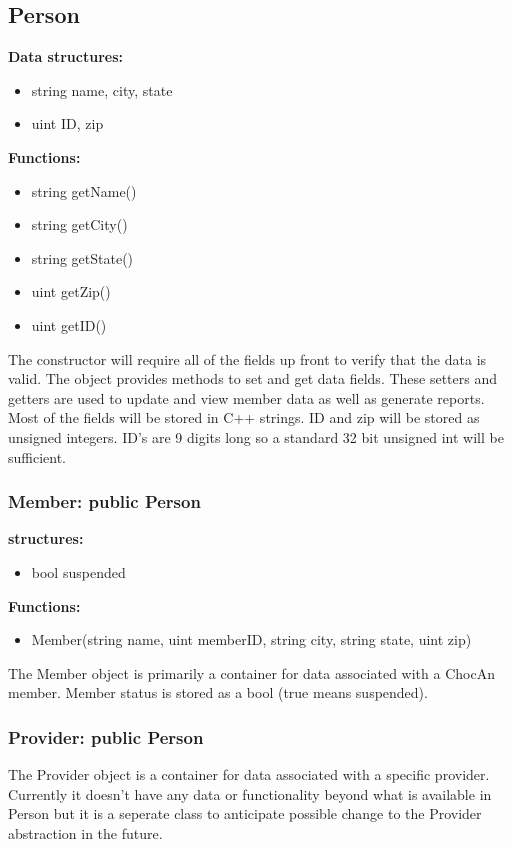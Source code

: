 \documentclass{article}
\begin{document}
\subsection{Person}
\textbf{Data structures:}
\begin{itemize}
   \item string name, city, state
   \item uint ID, zip
\end{itemize}
\textbf{Functions:}
\begin{itemize}
   \item string getName()
   \item string getCity()
   \item string getState()
   \item uint getZip()
   \item uint getID()
\end{itemize}
The constructor will require all of the fields up front to verify that the data is valid. The object provides methods to set and get data fields. These setters and getters are used to update and view member data as well as generate reports. Most of the fields will be stored in C++ strings. ID and zip will be stored as unsigned integers. ID’s are 9 digits long so a standard 32 bit unsigned int will be sufficient.

\subsubsection{Member: public Person}
\textbf{structures:}
\begin{itemize}
   \item bool suspended
\end{itemize}
\textbf{Functions:}
\begin{itemize}
   \item Member(string name, uint memberID, string city, string state, uint zip)
\end{itemize}
The Member object is primarily a container for data associated with a ChocAn member. Member status is stored as a bool (true means suspended). 

\subsubsection{Provider: public Person}
The Provider object is a container for data associated with a specific provider. Currently it doesn’t have any data or functionality beyond what is available in Person but it is a seperate class to anticipate possible change to the Provider abstraction in the future.
\end{document}
